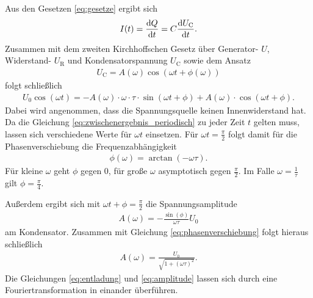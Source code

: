 \noindent
Aus den Gesetzen \eqref{eq:gesetze} ergibt sich 
\begin{align}
    I(t) = \frac{\mathop{}\!\mathrm{d}{Q}}{\mathop{}\!\mathrm{d}{t}} = C \frac{\mathop{}\!\mathrm{d}{U_\text{C}}}{\mathop{}\!\mathrm{d}{t}}.
    \label{eq:stromstaerke}
\end{align}
Zusammen mit dem zweiten Kirchhoffschen Gesetz über Generator- $U$, Widerstand- $U_\text{R}$ und Kondensatorspannung $U_\text{C}$ sowie dem Ansatz 
\begin{align}
    U_\text{C} = A(\omega) \cos\left(\omega t + \phi(\omega)\right)
\end{align}
folgt schließlich 
\begin{align}
    U_0 \cos(\omega t) = -A(\omega) \cdot \omega \cdot \tau \cdot \sin\left(\omega t + \phi\right) + A(\omega) \cdot \cos\left(\omega t + \phi\right).
    \label{eq:zwischenergebnis_periodisch}
\end{align}
Dabei wird angenommen, dass die Spannungsquelle keinen Innenwiderstand hat.
Da die Gleichung \eqref{eq:zwischenergebnis_periodisch} zu jeder Zeit $t$ gelten muss,
lassen sich verschiedene Werte für $\omega t$ einsetzen.
Für $\omega t = \frac{\pi}{2}$ folgt damit für die Phasenverschiebung die Frequenzabhängigkeit
\begin{align}
    \phi(\omega) = \arctan(- \omega \tau).
    \label{eq:phasenverschiebung}
\end{align}
Für kleine $\omega$ geht $\phi$ gegen 0, für große $\omega$ asymptotisch gegen $\frac{\pi}{2}$.
Im Falle $\omega = \frac{1}{\tau}$ gilt $\phi = \frac{\pi}{4}$.

\noindent
Außerdem ergibt sich mit $\omega t + \phi = \frac{\pi}{2}$ die Spannungsamplitude
\begin{align}
    A(\omega) = - \frac{\sin(\phi)}{\omega \tau} U_0
    \label{eq:sinusgleichung}
\end{align}
am Kondensator.
Zusammen mit Gleichung \eqref{eq:phasenverschiebung} folgt hieraus schließlich
\begin{align}
    A(\omega) = \frac{U_0}{\sqrt{1+ (\omega \tau)^2}}.
    \label{eq:amplitude}
\end{align}
Die Gleichungen \eqref{eq:entladung} und \eqref{eq:amplitude} lassen sich durch eine Fouriertransformation in einander überführen.